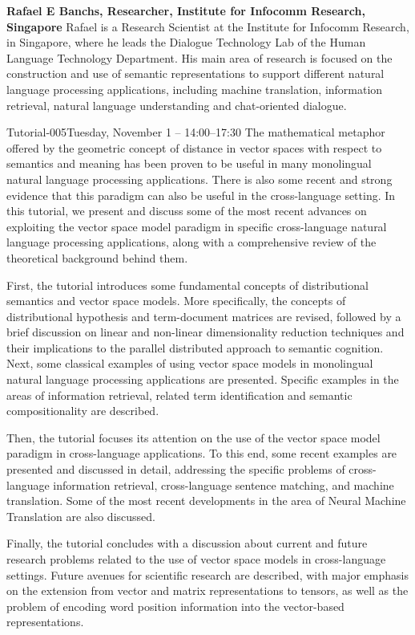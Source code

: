 \begin{bio}
\textbf{ Rafael E Banchs, Researcher, Institute for Infocomm Research, Singapore}
 Rafael is a Research Scientist at the Institute for Infocomm Research, in Singapore, where he leads the Dialogue Technology Lab of the Human Language Technology Department. His main area of research is focused on the construction and use of semantic representations to support different natural language processing applications, including machine translation, information retrieval, natural language understanding and chat-oriented dialogue. 
\end{bio}
\begin{tutorial}{Tutorial-005}{Tuesday, November 1 -- 14:00--17:30} {\TutLocE}
 The mathematical metaphor offered by the geometric concept of distance in vector spaces with respect to semantics and meaning has been proven to be useful in many monolingual natural language processing applications. There is also some recent and strong evidence that this paradigm can also be useful in the cross-language setting. In this tutorial, we present and discuss some of the most recent advances on exploiting the vector space model paradigm in specific cross-language natural language processing applications, along with a comprehensive review of the theoretical background behind them.

First, the tutorial introduces some fundamental concepts of distributional semantics and vector space models. More specifically, the concepts of distributional hypothesis and term-document matrices are revised, followed by a brief discussion on linear and non-linear dimensionality reduction techniques and their implications to the parallel distributed approach to semantic cognition. Next, some classical examples of using vector space models in monolingual natural language processing applications are presented. Specific examples in the areas of information retrieval, related term identification and semantic compositionality are described.

Then, the tutorial focuses its attention on the use of the vector space model paradigm in cross-language applications. To this end, some recent examples are presented and discussed in detail, addressing the specific problems of cross-language information retrieval, cross-language sentence matching, and machine translation. Some of the most recent developments in the area of Neural Machine Translation are also discussed.

Finally, the tutorial concludes with a discussion about current and future research problems related to the use of vector space models in cross-language settings. Future avenues for scientific research are described, with major emphasis on the extension from vector and matrix representations to tensors, as well as the problem of encoding word position information into the vector-based representations. 
\end{tutorial} 

